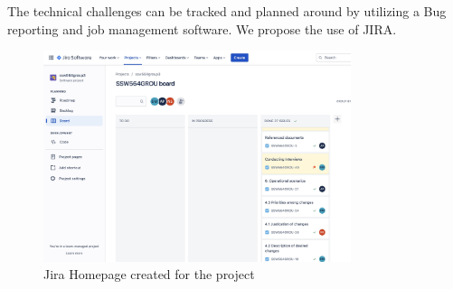 \noindent
The technical challenges can be tracked and planned around by utilizing a Bug reporting and job management software. We propose the use of JIRA.
\begin{figure}[H]
  \centering
   \includegraphics[width=9cm]{Figures/0DA589D3-1556-4FB9-9B0C-23CCDA029EBB_1_201_a.jpeg}
  \caption{Jira Homepage created for the project}
\label{}
\end{figure}
\newpage